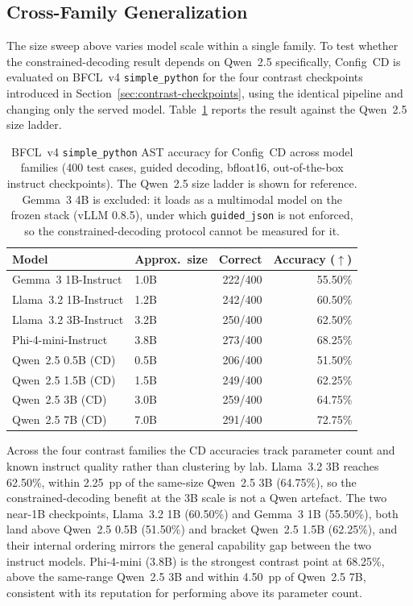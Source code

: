 \subsection{Cross-Family Generalization}
\label{sec:cross-family-cd}

The size sweep above varies model scale within a single family. To test whether
the constrained-decoding result depends on Qwen~2.5 specifically, Config~CD is
evaluated on BFCL~v4 \texttt{simple\_python} for the four contrast checkpoints
introduced in Section~\ref{sec:contrast-checkpoints}, using the identical
pipeline and changing only the served model. Table~\ref{tab:cross-family-cd}
reports the result against the Qwen~2.5 size ladder.

\begin{table}[ht]
\centering
\caption{BFCL~v4 \texttt{simple\_python} AST accuracy for Config~CD across model
families (400 test cases, guided decoding, bfloat16, out-of-the-box instruct
checkpoints). The Qwen~2.5 size ladder is shown for reference. Gemma~3 4B is
excluded: it loads as a multimodal model on the frozen stack (vLLM 0.8.5),
under which \texttt{guided\_json} is not enforced, so the constrained-decoding
protocol cannot be measured for it.}
\label{tab:cross-family-cd}
\begin{tabular}{llrr}
\toprule
Model & Approx.\ size & Correct & Accuracy ($\uparrow$) \\
\midrule
Gemma~3 1B-Instruct    & 1.0B & 222/400 & 55.50\% \\
Llama~3.2 1B-Instruct  & 1.2B & 242/400 & 60.50\% \\
Llama~3.2 3B-Instruct  & 3.2B & 250/400 & 62.50\% \\
Phi-4-mini-Instruct    & 3.8B & 273/400 & 68.25\% \\
\midrule
Qwen~2.5 0.5B (CD)     & 0.5B & 206/400 & 51.50\% \\
Qwen~2.5 1.5B (CD)     & 1.5B & 249/400 & 62.25\% \\
Qwen~2.5 3B (CD)       & 3.0B & 259/400 & 64.75\% \\
Qwen~2.5 7B (CD)       & 7.0B & 291/400 & 72.75\% \\
\bottomrule
\end{tabular}
\end{table}

Across the four contrast families the CD accuracies track parameter count and
known instruct quality rather than clustering by lab. Llama~3.2 3B reaches
62.50\%, within 2.25~pp of the same-size Qwen~2.5 3B (64.75\%), so the
constrained-decoding benefit at the 3B scale is not a Qwen artefact. The two
near-1B checkpoints, Llama~3.2 1B (60.50\%) and Gemma~3 1B (55.50\%), both land
above Qwen~2.5 0.5B (51.50\%) and bracket Qwen~2.5 1.5B (62.25\%), and their
internal ordering mirrors the general capability gap between the two instruct
models. Phi-4-mini (3.8B) is the strongest contrast point at 68.25\%, above the
same-range Qwen~2.5 3B and within 4.50~pp of Qwen~2.5 7B, consistent with its
reputation for performing above its parameter count.

